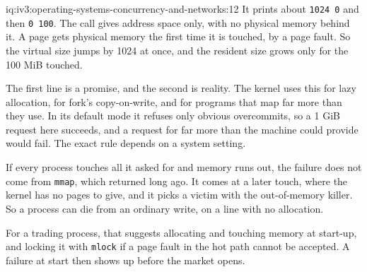\begin{solution}{iq:iv3:operating-systems-concurrency-and-networks:12}
It prints about \texttt{1024 0} and then \texttt{0 100}. The call gives address space only, with no physical memory behind it. A page gets physical memory the first time it is touched, by a page fault. So the virtual size jumps by 1024 at once, and the resident size grows only for the 100 MiB touched.

The first line is a promise, and the second is reality. The kernel uses this for lazy allocation, for fork's copy-on-write, and for programs that map far more than they use. In its default mode it refuses only obvious overcommits, so a 1 GiB request here succeeds, and a request for far more than the machine could provide would fail. The exact rule depends on a system setting.

If every process touches all it asked for and memory runs out, the failure does not come from \texttt{mmap}, which returned long ago. It comes at a later touch, where the kernel has no pages to give, and it picks a victim with the out-of-memory killer. So a process can die from an ordinary write, on a line with no allocation.

For a trading process, that suggests allocating and touching memory at start-up, and locking it with \texttt{mlock} if a page fault in the hot path cannot be accepted. A failure at start then shows up before the market opens.

\end{solution}

